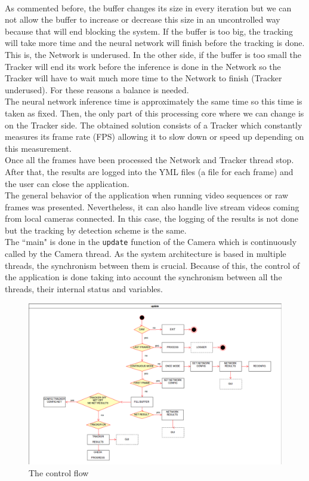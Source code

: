 \\As commented before, the buffer changes its size in every iteration but we can not allow the buffer to increase or decrease this size in an uncontrolled way because that will end blocking the system. If the buffer is too big, the tracking will take more time and the neural network will finish before the tracking is done. This is, the Network is underused. In the other side, if the buffer is too small the Tracker will end its work before the inference is done in the Network so the Tracker will have to wait much more time to the Network to finish (Tracker underused). For these reasons a balance is needed.\\
The neural network inference time is approximately the same time so this time is taken as fixed. Then, the only part of this processing core where we can change is on the Tracker side. The obtained solution consists of a Tracker which constantly measures its frame rate (FPS) allowing it to slow down or speed up depending on this measurement.\\
Once all the frames have been processed the Network and Tracker thread stop. After that, the results are logged into the YML files (a file for each frame) and the user can close the application.\\
The general behavior of the application when running video sequences or raw frames was presented. Nevertheless, it can also handle live stream videos coming from local cameras connected. In this case, the logging of the results is not done but the tracking by detection scheme is the same.\\
The ``main" is done in the \texttt{update} function of the Camera which is continuously called by the Camera thread. As the system architecture is based in multiple threads, the synchronism between them is crucial. Because of this, the control of the application is done taking into account the synchronism between all the threads, their internal status and variables.
\begin{figure}[H]
\begin{center}
\includegraphics[scale=0.3]{figures/update_camera.png}
\caption{The control flow}
\label{fig:update_cam}
\end{center}
\end{figure} 

